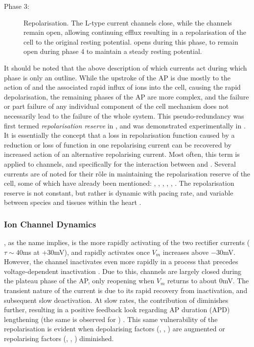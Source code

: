 \documentclass[../thesis-main.tex]{subfiles}
\begin{document}
\begin{description}
  \item[Phase 3:] Repolarisation. The L-type \ca{} current channels close, while the \iks{} channels remain open, allowing continuing \K{} efflux resulting in a repolarisation of the cell to the original resting potential. \ikix{} opens during this phase, to remain open during phase 4 to maintain a steady resting potential. 
 \end{description}
 It should be noted that the above description of which currents act during which phase is only an outline. While the upstroke of the AP is due mostly to the action of \ina{} and the associated rapid influx of \na{} ions into the cell, causing the rapid depolarisation, the remaining phases of the AP are more complex, and the failure or part failure of any individual component of the cell mechanism does not necessarily lead to the failure of the whole system. This pseudo-redundancy was first termed \emph{repolarisation reserve} in \citet{Roden1998}, and was demonstrated experimentally in \citet{Varro2000}. It is essentially the concept that a loss in repolarisation function caused by a reduction or loss of function in one repolarising current can be recovered by increased action of an alternative repolarising current. Most often, this term is applied to \K{} channels, and specifically for the interaction between \ikr{} and \iks{} \citep{Xiao2008}. Several currents are of noted for their r\^ole in maintaining the repolarisation reserve of the cell, some of which have already been mentioned: \ikr{}, \iks{}, \ikix{}, \ito{}, \ica{}, \ina{} \citep{Varro2011}. The repolarisation reserve is not constant, but rather is dynamic with pacing rate, and variable between species and tissues within the heart \citep{Carmeliet2006}.
 
 \subsubsection{Ion Channel Dynamics}
 \label{subsubsec:channel-dynamics} 
 \ikr{}, as the name implies, is the more rapidly activating of the two rectifier \K{} currents ($\tau\sim40$ms at $+30$mV), and rapidly activates once $V_m$ increases above $-30$mV. However, the channel inactivates even more rapidly in a process that precedes voltage-dependent inactivation \citep{Varro2011, Spector1996, Carmeliet2006}. Due to this, \ikr{} channels are largely closed during the plateau phase of the AP, only reopening when $V_m$ returns to about 0mV. The transient nature of the current is due to its rapid recovery from inactivation, and subsequent slow deactivation. At slow rates, the contribution of \ikr{} diminishes further, resulting in a positive feedback look regarding AP duration (APD) lengthening (the same is observed for \ikix{}) \citep{Virag2009}. This same vulnerability of the repolarisation is evident when depolarising factors (\eg, \ina{}, \ica{}) are augmented or repolarising factors (\eg, \iks{}, \ikix{}) diminished.
 
\end{document}
